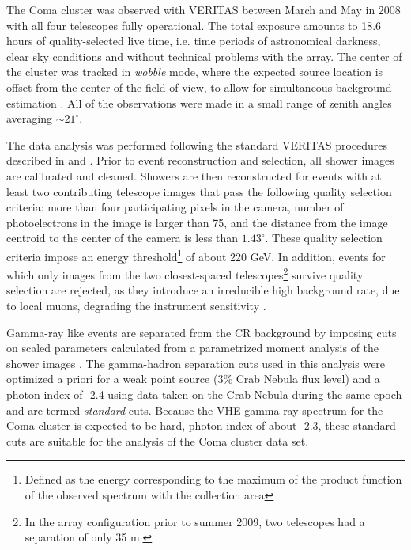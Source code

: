 \documentclass[12pt,manuscript]{aastex}
\begin{document}
The Coma cluster was observed with VERITAS between March and May in 2008 with all four telescopes
fully operational. The total exposure amounts to 18.6 hours of quality-selected live time, i.e.
time periods of astronomical darkness, clear sky conditions and without technical problems with the
array. The center of the cluster was tracked in \emph{wobble} mode, where the expected source
location is offset from the center of the field of view, to allow for simultaneous background
estimation \citep{article:Formin_etal:1994}. All of the observations were made in a small range of
zenith angles averaging $\sim 21^{\circ}$.

The data analysis was performed following the standard VERITAS procedures described in
\citet{inproc:Cogan_etal:2007} and \citet{inproc:Daniel_etal:2007}. Prior to event reconstruction
and selection, all shower images are calibrated and cleaned. Showers are then reconstructed for
events with at least two contributing telescope images that pass the following quality selection
criteria: more than four participating pixels in the camera, number of photoelectrons in the image
is larger than 75, and the distance from the image centroid to the center of the camera is less
than $1.43^{\circ}$. These quality selection criteria impose an energy threshold\footnote{Defined
as the energy corresponding to the maximum of the product function of the observed spectrum with
the collection area} of about 220 GeV. In addition, events for which only images from the two
closest-spaced telescopes\footnote{In the array configuration prior to summer 2009, two telescopes 
had a separation of only 35 m.} survive quality selection are rejected, as they introduce an
irreducible high background rate, due to local muons, degrading the instrument sensitivity
\citep{article:MaierKnapp:2007}.

Gamma-ray like events are separated from the CR background by imposing cuts on scaled parameters
\citep{article:Aharonian_etal:1997, article:Krawczynski_etal:2006} calculated from a parametrized
moment analysis of the shower images \citep{inproc:Hillas:1985}. The gamma-hadron separation cuts
used in this analysis were optimized a priori for a weak point source (3\% Crab Nebula flux level)
and a photon index of -2.4 using data taken on the Crab Nebula during the same epoch and are termed
\emph{standard} cuts. Because the VHE gamma-ray spectrum for the Coma cluster is expected to be
hard, photon index of about -2.3, these standard cuts are suitable for the analysis of the Coma
cluster data set. 
\end{document}
